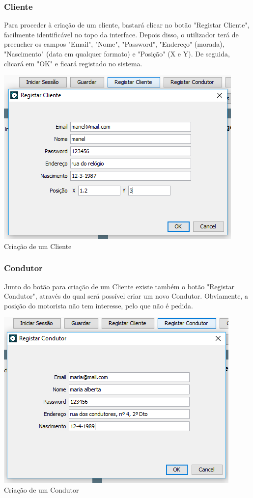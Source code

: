 \documentclass[a4paper]{article}
\begin{document}
\subsubsection{Cliente}
Para proceder à criação de um cliente, bastará clicar no botão "Registar Cliente", facilmente identificável no topo da interface. Depois disso, o utilizador terá de preencher os campos "Email", "Nome", "Password", "Endereço" (morada), "Nascimento" (data em qualquer formato) e "Posição" (X e Y). De seguida, clicará em "OK" e ficará registado no sistema.
\begin{center}
  \includegraphics[scale=0.75]{criar_cliente}\\
  \caption{Criação de um Cliente}
  \label{fig:picture}
\end{center}

\subsubsection{Condutor}
Junto do botão para criação de um Cliente existe também o botão "Registar Condutor", através do qual será possível criar um novo Condutor. Obviamente, a posição do motorista não tem interesse, pelo que não é pedida.
\begin{center}
  \includegraphics[scale=0.75]{criar_condutor}\\
  \caption{Criação de um Condutor}
  \label{fig:picture}
\end{center}
\end{document}
